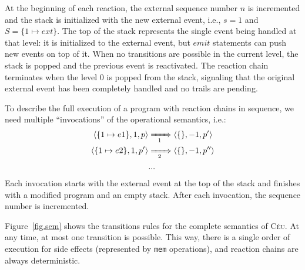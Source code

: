 \documentclass{acm_proc_article-sp}
\newcommand{\CEU}{\textsc{C\'{e}u}\xspace}
\newcommand{\code}[1] {{\small{\texttt{#1}}}}
\newcommand{\LL}{\langle}
\newcommand{\RR}{\rangle}
\newcommand{\1}{\;}
\newcommand{\2}{\;\;}
\newcommand{\3}{\;\;\;}
\newcommand{\5}{\;\;\;\;\;}
\begin{document}
At the beginning of each reaction, the external sequence number $n$ is 
incremented and the stack is initialized with the new external event, i.e., 
$s=1$ and $S=\{ 1 \mapsto ext \}$.
%
The top of the stack represents the single event being handled at that level:
it is initialized to the external event, but $emit$ statements can push new 
events on top of it.
When no transitions are possible in the current level, the stack is popped and 
the previous event is reactivated.
The reaction chain terminates when the level 0 is popped from the stack, 
signaling that the original external event has been completely handled and no 
trails are pending.

To describe the full execution of a program with reaction chains in sequence, 
we need multiple ``invocations'' of the operational semantics, i.e.:
%
\begin{align*}
\LL \{ 1 \mapsto e1 \}, 1, p \RR
    & \xRightarrow[~~1~~]{}
\LL \{\}, -1, p' \RR
\\
\LL \{ 1 \mapsto e2 \}, 1, p' \RR
    & \xRightarrow[~~2~~]{}
\LL \{\}, -1, p'' \RR
\\
& ...
\end{align*}
%
Each invocation starts with the external event at the top of the stack and 
finishes with a modified program and an empty stack.
After each invocation, the sequence number is incremented.

Figure~\ref{fig.sem} shows the transitions rules for the complete semantics of 
\CEU.
At any time, at most one transition is possible.
This way, there is a single order of execution for side effects (represented by 
\code{mem} operations), and reaction chains are always deterministic.
\end{document}
